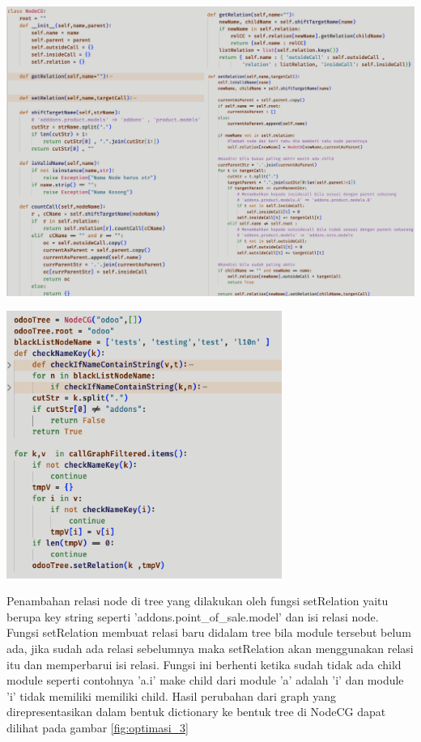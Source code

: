 \begin{center}
	\includegraphics[width=14cm]{img/bab_4/optimisasi_1.png}
	\label{fig:optimasi_1}
\end{center}

\begin{center}
	\includegraphics[width=9cm]{img/bab_4/optimisasi_2.png}
	\label{fig:optimasi_2}
\end{center}

Penambahan relasi node di tree yang dilakukan oleh fungsi setRelation yaitu berupa key string seperti 'addons.point{\_}of{\_}sale.model' dan isi relasi node. Fungsi setRelation membuat relasi baru didalam tree bila module tersebut belum ada, jika sudah ada relasi sebelumnya maka setRelation akan menggunakan relasi itu dan memperbarui isi relasi. Fungsi ini berhenti ketika sudah tidak ada child module seperti contohnya 'a.i' make child dari module 'a' adalah 'i' dan module 'i' tidak memiliki memiliki child. Hasil perubahan dari graph yang direpresentasikan dalam bentuk dictionary ke bentuk tree di NodeCG dapat dilihat pada gambar \ref{fig:optimasi_3}

